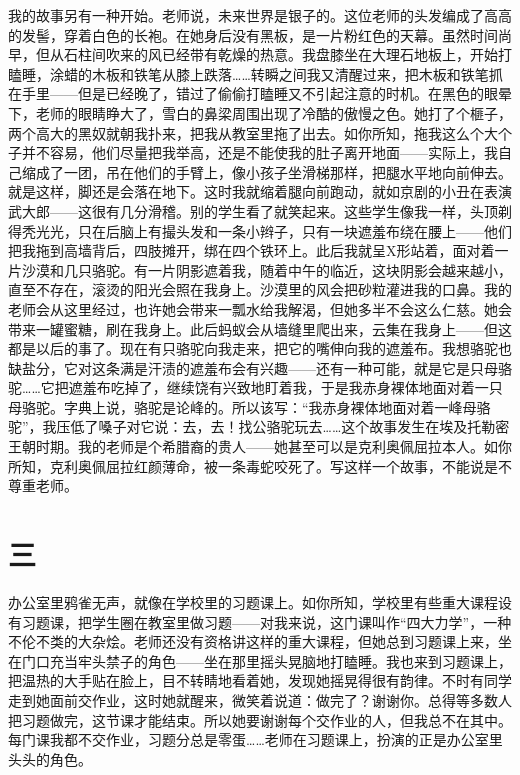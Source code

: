 我的故事另有一种开始。老师说，未来世界是银子的。这位老师的头发编成了高高的发髻，穿着白色的长袍。在她身后没有黑板，是一片粉红色的天幕。虽然时间尚早，但从石柱间吹来的风已经带有乾燥的热意。我盘膝坐在大理石地板上，开始打瞌睡，涂蜡的木板和铁笔从膝上跌落……转瞬之间我又清醒过来，把木板和铁笔抓在手里——但是已经晚了，错过了偷偷打瞌睡又不引起注意的时机。在黑色的眼晕下，老师的眼睛睁大了，雪白的鼻梁周围出现了冷酷的傲慢之色。她打了个榧子，两个高大的黑奴就朝我扑来，把我从教室里拖了出去。如你所知，拖我这么个大个子并不容易，他们尽量把我举高，还是不能使我的肚子离开地面——实际上，我自己缩成了一团，吊在他们的手臂上，像小孩子坐滑梯那样，把腿水平地向前伸去。就是这样，脚还是会落在地下。这时我就缩着腿向前跑动，就如京剧的小丑在表演武大郎——这很有几分滑稽。别的学生看了就笑起来。这些学生像我一样，头顶剃得秃光光，只在后脑上有撮头发和一条小辫子，只有一块遮羞布绕在腰上——他们把我拖到高墙背后，四肢摊开，绑在四个铁环上。此后我就呈X形站着，面对着一片沙漠和几只骆驼。有一片阴影遮着我，随着中午的临近，这块阴影会越来越小，直至不存在，滚烫的阳光会照在我身上。沙漠里的风会把砂粒灌进我的口鼻。我的老师会从这里经过，也许她会带来一瓢水给我解渴，但她多半不会这么仁慈。她会带来一罐蜜糖，刷在我身上。此后蚂蚁会从墙缝里爬出来，云集在我身上——但这都是以后的事了。现在有只骆驼向我走来，把它的嘴伸向我的遮羞布。我想骆驼也缺盐分，它对这条满是汗渍的遮羞布会有兴趣——还有一种可能，就是它是只母骆驼……它把遮羞布吃掉了，继续饶有兴致地盯着我，于是我赤身裸体地面对着一只母骆驼。字典上说，骆驼是论峰的。所以该写：“我赤身裸体地面对着一峰母骆驼”，我压低了嗓子对它说：去，去！找公骆驼玩去……这个故事发生在埃及托勒密王朝时期。我的老师是个希腊裔的贵人——她甚至可以是克利奥佩屈拉本人。如你所知，克利奥佩屈拉红颜薄命，被一条毒蛇咬死了。写这样一个故事，不能说是不尊重老师。 


\section*{三} 

办公室里鸦雀无声，就像在学校里的习题课上。如你所知，学校里有些重大课程设有习题课，把学生圈在教室里做习题——对我来说，这门课叫作“四大力学”，一种不伦不类的大杂烩。老师还没有资格讲这样的重大课程，但她总到习题课上来，坐在门口充当牢头禁子的角色——坐在那里摇头晃脑地打瞌睡。我也来到习题课上，把温热的大手贴在脸上，目不转睛地看着她，发现她摇晃得很有韵律。不时有同学走到她面前交作业，这时她就醒来，微笑着说道：做完了？谢谢你。总得等多数人把习题做完，这节课才能结束。所以她要谢谢每个交作业的人，但我总不在其中。每门课我都不交作业，习题分总是零蛋……老师在习题课上，扮演的正是办公室里头头的角色。 

